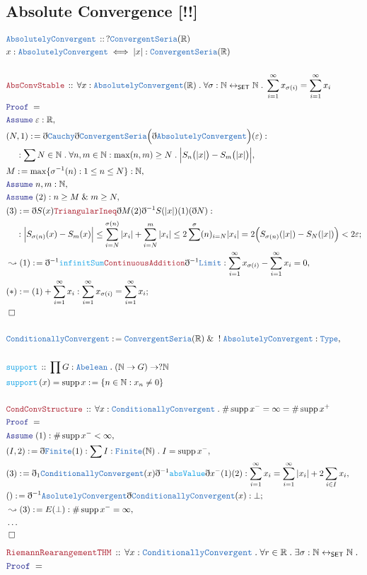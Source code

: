 \documentclass[12pt]{scrartcl}
\newcommand{\TYPE}[1]{\textcolor{NavyBlue}{\mathtt{#1}}}
\newcommand{\FUNC}[1]{\textcolor{Cerulean}{\mathtt{#1}}}
\newcommand{\LOGIC}[1]{\textcolor{Blue}{\mathtt{#1}}}
\newcommand{\THM}[1]{\textcolor{Maroon}{\mathtt{#1}}}
\renewcommand{\.}{\; . \;}
\newcommand{\de}{: \kern 0.1pc =}
\newcommand{\IsNot}{\; ! \;}
\newcommand{\Act}[1]{\left( #1 \right)}
\newcommand{\Theorem}[2]{& \THM{#1} \, :: \, #2 \\ & \Proof = \\ }
\newcommand{\DeclareType}[2]{& \TYPE{#1} \, :: \, #2 \\}
\newcommand{\DefineType}[3]{& #1 : \TYPE{#2} \iff #3 \\}
\newcommand{\DeclareFunc}[2]{& \FUNC{#1} \, :: \, #2 \\}
\newcommand{\DefineNamedFunc}[4]{&  \FUNC{#1}\Act{#2} = #3 \de #4 \\}
\newcommand{\NewLine}{\\ & \kern 1pc}
\newcommand{\Page}[1]{ \begin{align*} #1 \end{align*}   }
\newcommand{ \bd }{ \ByDef }
\newcommand{\NoProof}{ & \ldots \\ \EndProof}
\renewcommand{\And}{\; \& \;}
\newcommand{\Reals}{\mathbb{R} }
\newcommand{\Nat}{\mathbb{N} }
\DeclareMathOperator*{\supp}{supp}
\newcommand{\ToBij}{\leftrightarrow}
\newcommand{\Say}[3]{& #1 \de #2 : #3, \\}
\newcommand{\Conclude}[3]{& #1 \de #2 : #3; \\}
\newcommand{\Derive}[3]{& \leadsto #1 \de #2 : #3, \\}
\newcommand{\Assume}[2]{& \LOGIC{Assume} \;#1 : #2, \\}
\newcommand{\QED}{\; \square}
\newcommand{\EndProof}{& \QED \\}
\newcommand{\ByDef}{\eth}
\newcommand{\Proof}{\LOGIC{Proof} \; }
\newcommand{\CC}{ \TYPE{ConditionallyConvergent}}
\begin{document}
\subsection{Absolute Convergence [!!]}
\Page{
	\DeclareType{AbsolutelyConvergent}{?\TYPE{ConvergentSeria}(\Reals)}
	\DefineType{x}{AbsolutelyConvergent}{ |x| : \TYPE{ConvergentSeria}(\Reals)}
	\\
	\Theorem{AbsConvStable}{ \forall  x : \TYPE{AbsolutelyConvergent}(\Reals) \. 
		\forall  \sigma : \Nat \ToBij_{\mathsf{SET}} \Nat \. 
		\sum^\infty_{i=1} x_{\sigma(i)} = \sum^\infty_{i=1} x_i   }
	\Assume{\varepsilon}{\Reals}
	\Say{(N,1)}{ \bd \TYPE{Cauchy} \bd \TYPE{ConvergentSeria}\Big( \bd \TYPE{AbsolutelyConvergent} \Big)(\varepsilon)   }
	{ 
		\NewLine :
		\sum N \in \Nat \. \forall n,m \in \Nat : \max(n,m) \ge N \.  \Big| S_n\big(|x|\big) - S_m\big(|x|\big) \Big|      
	}
	\Say{M}{\max \{  \sigma^{-1}(n) :  1 \le n \le N  \} }{\Nat}
	\Assume{n,m}{\Nat}
	\Assume{(2)}{ n \ge M \And m \ge N}
	\Conclude{(3)  }{ \bd S(x) \THM{TriangularIneq} \bd M(2)\bd^{-1}S(|x|)(1)(\bd N)  }
	{      
		\NewLine:
		\Big| S_{\sigma(n)}(x) - S_{m}(x) \Big| \le \sum_{i = N}^{\sigma(n)} | x_i | +
		\sum_{i = N}^{m} |x_i|
		\le 2\sum^\sigma(n)_{i = N } | x_i|  =  2\Big(  S_{\sigma(n)}(|x|) - S_{N}(|x|) \Big)
		< 2\varepsilon
	}
	\Derive{(1)}{
		    \bd^{-1} \FUNC{infinitSum}   \THM{ContinuousAddition}\bd^{-1}\TYPE{Limit}}
	{ \sum^\infty_{i=1} x_{\sigma(i)} - \sum^\infty_{i=1} x_i = 0}
	\Conclude{(*)}{ (1) + \sum^\infty_{i=1} x_i }{ \sum_{i=1}^\infty  x_{\sigma(i)} = \sum^\infty_{i=1} x_i}
	\EndProof
	\\
	\Say{\TYPE{ConditionallyConvergent}}{ \TYPE{ConvergentSeria}(\Reals) \And \IsNot \TYPE{AbsolutelyConvergent}}
	{\TYPE{Type}}
	\\
	\DeclareFunc{support}{\prod G : \TYPE{Abelean} \. (\Nat \to G) \to ?\Nat }
	\DefineNamedFunc{support}{x}{\supp x}{ \{ n \in \Nat : x_n \neq 0  \}}
	\\
	\Theorem{CondConvStructure}{\forall x : \CC \.  \# \supp x^- = \infty = \# \supp x^+ }
	\Assume{(1)}{\# \supp x^- < \infty}
	\Say{(I, 2)}{  \bd \TYPE{Finite} (1)}{ \sum I : \TYPE{Finite}(\Nat) \. I = \supp x^-  }
	\Say{(3)}{\bd_1 \CC(x) \bd^{-1} \FUNC{absValue}\bd x^-(1)(2)}
	{ \sum^{\infty}_{i = 1} x_i = \sum^{\infty}_{i=1} |x_i| + 2 \sum_{i \in I} x_i   }
	\Conclude{()}{\bd^{-1} \TYPE{AsolutelyConvergent} \bd \CC(x)}{\bot}
	\Derive{(3)}{E(\bot)}{ \# \supp x^- = \infty }
	\NoProof
}\Page{
	\Theorem{RiemannRearangementTHM}{
		\forall x : \CC \. 
		\forall r \in \Reals \. 
		\exists  \sigma : \Nat \ToBij_{\mathsf{SET}} \Nat \. 
}}
\end{document}
